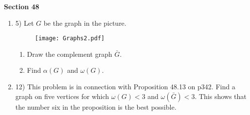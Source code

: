 \documentclass[11pt]{preprint}
\def\enumb{\begin{enumerate}}
\def\enume{\end{enumerate}}
\begin{document}
\textbf{Section 48}

\enumb
\item[5)] Let $G$ be the graph in the picture.
\begin{figure}[ht]
\centering
\texttt{[image: Graphs2.pdf]}
\end{figure}
\enumb
\item Draw the complement graph $\bar{G}$.
\item Find $\alpha(G)$ and $\omega(G)$.
\enume
\item[12)] This problem is in connection with Proposition 48.13 on p342. Find a graph on five vertices for which $\omega(G)<3$ and $\omega(\bar{G})<3$. This shows that the number six in the proposition is the best possible.
\enume
\end{document}
